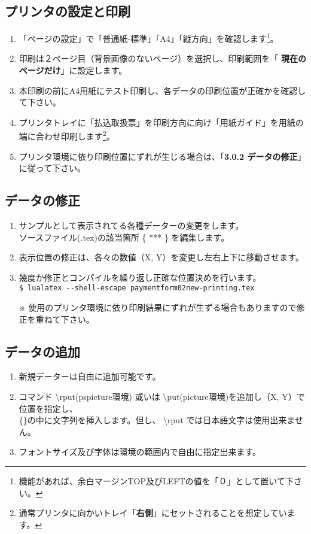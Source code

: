 \documentclass[a4paper,10pt,titlepage]{ltjsarticle}
\def\colH#1{\color[HTML]{#1}}
\def\bs#1{\textbackslash{#1}}
\begin{document}
\subsection{プリンタの設定と印刷}
\begin{enumerate}
  \item 「ページの設定」で「普通紙-標準」「A4」「縦方向」を確認します\footnote{機能があれば、余白マージンTOP及びLEFTの値を「０」として置いて下さい。}。
  \item 印刷は２ページ目（背景画像のないページ）を選択し、印刷範囲を「{\bfseries\colH{800000} 現在のページだけ}」に設定します。
  \item 本印刷の前にA4用紙にテスト印刷し、各データの印刷位置が正確かを確認して下さい。
  \item プリンタトレイに「払込取扱票」を印刷方向に向け「用紙ガイド」を用紙の端に合わせ印刷します\footnote{通常プリンタに向かいトレイ「{\bfseries 右側}」にセットされることを想定しています。}。
  \item プリンタ環境に依り印刷位置にずれが生じる場合は、「{\bfseries 3.0.2 データの修正}」に従って下さい。

\end{enumerate}

\subsection{データの修正}
 \begin{enumerate}
   \item サンプルとして表示されてる各種データーの変更をします。\\
   ソースファイル(.tex)の該当箇所 \{\; *** \;\} を編集します。

   \item 表示位置の修正は、各々の数値（\;X, Y\;）を変更し左右上下に移動させます。

   \item 幾度か修正とコンパイルを繰り返し正確な位置決めを行います。\\
   \verb|$ lualatex --shell-escape paymentform02new-printing.tex|           
  \item[※] 使用のプリンタ環境に依り印刷結果にずれが生ずる場合もありますので修正を重ねて下さい。
 \end{enumerate}

\subsection{データの追加}
 \begin{enumerate}
   \item 新規データーは自由に追加可能です。
   \item コマンド {\colH{800000} \bs rput}(pspicture環境) 或いは {\colH{800000} \bs put}(picture環境)を追加し（\;X, Y\;）で位置を指定し、\\
   \{\quad \}の中に文字列を挿入します。但し、 {\colH{800000} \bs rput では日本語文字は使用出来ません}。
   \item フォントサイズ及び字体は環境の範囲内で自由に指定出来ます。
   　
 \end{enumerate}
\end{document}

